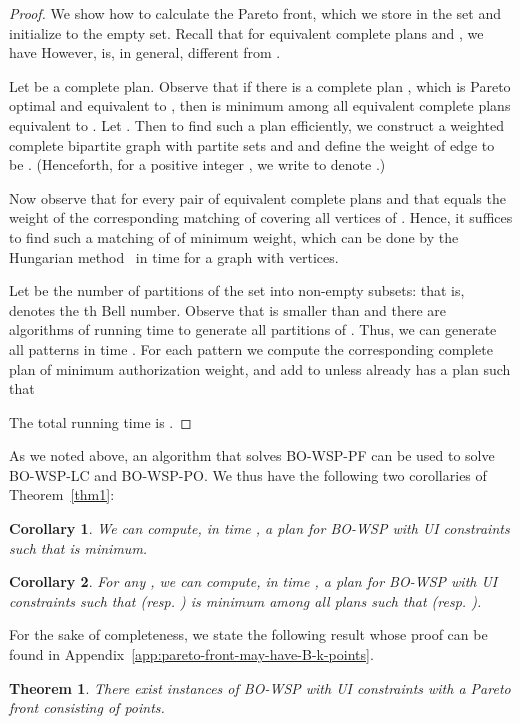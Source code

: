 \documentclass[jcs,crcready]{iosart1c}
\newtheorem{thm}{Theorem}
\newtheorem{cor}{Corollary}
\newcommand{\BOWSP}{\textsc{BO-WSP}\xspace}
\newcommand{\BOWSPLC}{\textsc{BO-WSP-LC}\xspace}
\newcommand{\BOWSPPO}{\textsc{BO-WSP-PO}\xspace}
\newcommand{\BOWSPPF}{\textsc{BO-WSP-PF}\xspace}
\begin{document}
\begin{proof}
We show how to calculate the Pareto front, which we store in the set  and initialize to the empty set.
Recall that for equivalent complete plans  and , we have 
However,  is, in general, different from . 

Let  be a complete plan. 
Observe that if there is a complete plan , which is Pareto optimal and equivalent to , then  is minimum among all equivalent complete plans equivalent to .
Let .
Then to find such a plan  efficiently, we construct a weighted complete bipartite graph  with partite sets  and  and define the weight of edge  to be .
(Henceforth, for a positive integer , we write  to denote .) 

Now observe that  for every pair  of equivalent complete plans and that  equals the weight of the corresponding matching of  covering all vertices of . Hence, it suffices to find such a matching of  of minimum weight, which can be done by the Hungarian method~\cite{Ku55} in time  for a graph with  vertices.

Let  be the number of partitions of the set  into non-empty subsets: that is,  denotes the th Bell number. 
Observe that  is smaller than  and there are algorithms of running time   to generate all partitions of  \cite{Er88}. 
Thus, we can generate all patterns in time . 
For each pattern we compute the corresponding complete plan  of minimum authorization weight, and add  to  unless  already has a plan  such that 
 
The total running time is  .
\end{proof}

As we noted above, an algorithm that solves \BOWSPPF can be used to solve \BOWSPLC and \BOWSPPO. 
We thus have the following two corollaries of Theorem~\ref{thm1}:

\begin{cor}
We can compute, in time , a plan  for \BOWSP with UI constraints such that  is minimum.
\end{cor}
\begin{cor}
For any , we can compute, in time , a plan  for \BOWSP with UI constraints such that  (resp. ) is minimum among all plans  such that  (resp. ).
\end{cor}

For the sake of completeness, we state the following result whose proof can be found in Appendix~\ref{app:pareto-front-may-have-B-k-points}. 

\begin{thm}\label{thm:tightness}
There exist instances of \BOWSP with UI constraints with a Pareto front consisting of  points.
\end{thm}
\end{document}
